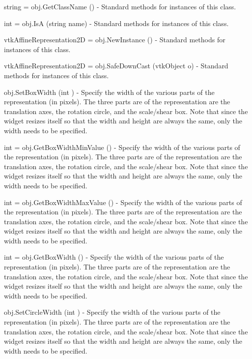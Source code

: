 \begin{DoxyItemize}
\item {\ttfamily string = obj.\-Get\-Class\-Name ()} -\/ Standard methods for instances of this class.  
\item {\ttfamily int = obj.\-Is\-A (string name)} -\/ Standard methods for instances of this class.  
\item {\ttfamily vtk\-Affine\-Representation2\-D = obj.\-New\-Instance ()} -\/ Standard methods for instances of this class.  
\item {\ttfamily vtk\-Affine\-Representation2\-D = obj.\-Safe\-Down\-Cast (vtk\-Object o)} -\/ Standard methods for instances of this class.  
\item {\ttfamily obj.\-Set\-Box\-Width (int )} -\/ Specify the width of the various parts of the representation (in pixels). The three parts are of the representation are the translation axes, the rotation circle, and the scale/shear box. Note that since the widget resizes itself so that the width and height are always the same, only the width needs to be specified.  
\item {\ttfamily int = obj.\-Get\-Box\-Width\-Min\-Value ()} -\/ Specify the width of the various parts of the representation (in pixels). The three parts are of the representation are the translation axes, the rotation circle, and the scale/shear box. Note that since the widget resizes itself so that the width and height are always the same, only the width needs to be specified.  
\item {\ttfamily int = obj.\-Get\-Box\-Width\-Max\-Value ()} -\/ Specify the width of the various parts of the representation (in pixels). The three parts are of the representation are the translation axes, the rotation circle, and the scale/shear box. Note that since the widget resizes itself so that the width and height are always the same, only the width needs to be specified.  
\item {\ttfamily int = obj.\-Get\-Box\-Width ()} -\/ Specify the width of the various parts of the representation (in pixels). The three parts are of the representation are the translation axes, the rotation circle, and the scale/shear box. Note that since the widget resizes itself so that the width and height are always the same, only the width needs to be specified.  
\item {\ttfamily obj.\-Set\-Circle\-Width (int )} -\/ Specify the width of the various parts of the representation (in pixels). The three parts are of the representation are the translation axes, the rotation circle, and the scale/shear box. Note that since the widget resizes itself so that the width and height are always the same, only the width needs to be specified.  

\end{DoxyItemize}
